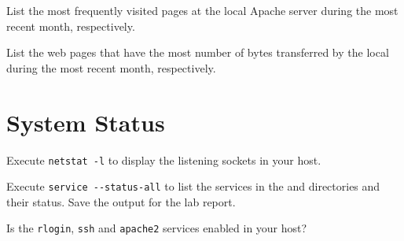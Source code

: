\documentclass{../UTNetLab}
\begin{document}
    \begin{report}
    \item List the most frequently visited pages at the local Apache server during the most recent month, respectively.
    
    \item List the web pages that have the most number of bytes transferred by the local during the most recent month, respectively.
    \end{report}

\section{System Status}
    Execute \lstinline{netstat -l} to display the listening sockets in your host.

    Execute \lstinline{service --status-all} to list the services in the  and  directories and their status. Save the output for the lab report.
    
    \begin{report}
    \item Is the \lstinline{rlogin}, \lstinline{ssh} and \lstinline{apache2} services enabled in your host?
    \end{report}
\end{document}
